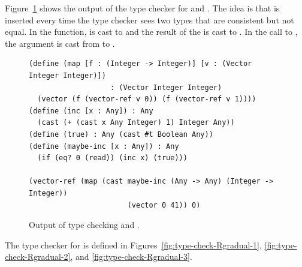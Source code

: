 \documentclass[7x10]{TimesAPriori_MIT}%
\begin{document}
Figure~\ref{fig:map-cast} shows the output of the type checker for
 and .  The idea is that  is
inserted every time the type checker sees two types that are
consistent but not equal. In the  function,  is
cast to  and the result of the \code{+} is cast to
.  In the call to , the  argument
is cast from  to .

\begin{figure}[btp]
\begin{lstlisting}[basicstyle=\ttfamily\footnotesize]
(define (map [f : (Integer -> Integer)] [v : (Vector Integer Integer)])
                   : (Vector Integer Integer)
  (vector (f (vector-ref v 0)) (f (vector-ref v 1))))
(define (inc [x : Any]) : Any
  (cast (+ (cast x Any Integer) 1) Integer Any))
(define (true) : Any (cast #t Boolean Any))
(define (maybe-inc [x : Any]) : Any
  (if (eq? 0 (read)) (inc x) (true)))

(vector-ref (map (cast maybe-inc (Any -> Any) (Integer -> Integer))
                       (vector 0 41)) 0)
\end{lstlisting}
\caption{Output of type checking 
  and .}
\label{fig:map-cast}
\end{figure}


The type checker for \LangGrad{} is defined in
Figures~\ref{fig:type-check-Rgradual-1}, \ref{fig:type-check-Rgradual-2},
and \ref{fig:type-check-Rgradual-3}.
\end{document}
